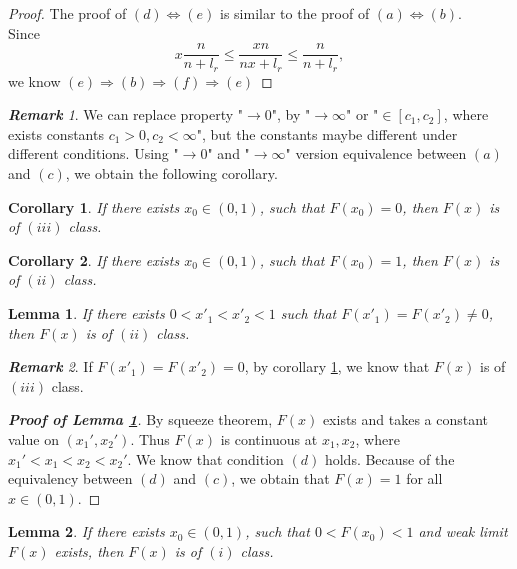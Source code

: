 \documentclass[12pt]{article}
\theoremstyle{plain}
\newtheorem{lem}{\textbf{Lemma}}
\newtheorem{cor}{\textbf{Corollary}}
\theoremstyle{definition}
\theoremstyle{remark}
\newtheorem{rem}{\textbf{Remark}}
\begin{document}
\begin{proof}
	The proof of $(d)\Leftrightarrow(e)$ is similar to the proof of $(a)\Leftrightarrow(b)$. \\
	Since
	\begin{equation*}
x\dfrac{n}{n+l_r}\leq \dfrac{xn}{nx+l_r}\leq \dfrac{n}{n+l_r},
	\end{equation*}
we know $(e)\Rightarrow (b)\Rightarrow (f)\Rightarrow (e)$
\end{proof}
\begin{rem}\label{rem6}
	We can replace property "$\to 0$", by "$\to \infty$"  or  "$\in [c_1,c_2] $, where exists constants $c_1>0, c_2<\infty$", but the constants maybe different under different conditions. Using "$\to 0$" and "$\to \infty$" version equivalence between $(a)$ and $(c)$, we obtain the following corollary.
\end{rem}
\begin{cor}\label{corollary1}
If there exists $x_0\in (0,1)$, such that $F(x_0)=0$, then $F(x)$ is of $(iii)$ class. 
\end{cor}
\begin{cor}
	If there exists $x_0\in (0,1)$, such that $F(x_0)=1$, then $F(x)$ is of $(ii)$ class. 
\end{cor}

\begin{lem}\label{lem4_new}
    If there exists $0<x'_{1}<x'_{2}<1$ such that $F(x'_1)=F(x'_2)\neq 0$, then $F(x)$ is of $(ii)$ class. 
\end{lem}
\begin{rem}\label{rem7_new}
	If $F(x'_1)=F(x'_2)=0$, by corollary \ref{corollary1}, we know that $F(x)$ is of $(iii)$ class.\\
\end{rem}
\begin{proof}[\textit{\textbf{Proof of Lemma \ref{lem4_new}}}]
    By squeeze theorem, $F(x)$ exists and takes a constant value on $(x_1',x_2')$. Thus $F(x)$  is continuous at $x_1,x_2$, where $x_1'<x_1<x_2<x_2'$. We know that condition $(d)$ holds. Because of the equivalency between $(d)$ and $(c)$, we obtain that $F(x)=1$ for all $x \in(0,1)$.
\end{proof}
\begin{lem}
If there exists $x_0\in (0,1)$, such that $0<F(x_0)<1$ and weak limit $F(x)$ exists, then $F(x)$ is of $(i)$ class. 
\end{lem}
\end{document}
